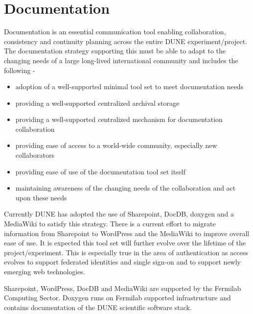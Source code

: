 \section{Documentation}
Documentation is an essential communication tool enabling collaboration, consistency and continuity planning across the entire DUNE experiment/project. The documentation strategy supporting this must be able to adapt to the changing needs of a large long-lived international community and includes the following -
\begin{itemize}
\item adoption of a well-supported minimal tool set to meet documentation needs
\item providing a well-supported centralized archival storage
\item providing a well-supported centralized mechanism for documentation collaboration
\item providing ease of access to a world-wide community, especially new collaborators
\item providing ease of use of the documentation tool set itself
\item maintaining awareness of the changing needs of the collaboration and act upon these needs
\end{itemize}
Currently DUNE has adopted the use of Sharepoint, DocDB, doxygen and a MediaWiki to satisfy this strategy. There is a current effort to migrate information from Sharepoint to WordPress and the MediaWiki to improve overall ease of use. It is expected this tool set will further evolve over the lifetime of the project/experiment.  This is especially true in the area of authentication as access evolves to support federated identities and single sign-on and to support newly emerging web technologies.

Sharepoint, WordPress, DocDB and MediaWiki are supported by the Fermilab Computing Sector.  Doxygen runs on Fermilab supported infrastructure and contains documentation of the DUNE scientific software stack.


